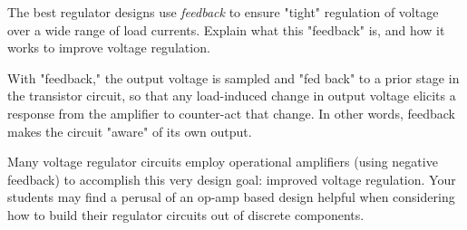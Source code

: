

The best regulator designs use {\it feedback} to ensure "tight" regulation of voltage over a wide range of load currents.  Explain what this "feedback" is, and how it works to improve voltage regulation.







With "feedback," the output voltage is sampled and "fed back" to a prior stage in the transistor circuit, so that any load-induced change in output voltage elicits a response from the amplifier to counter-act that change.  In other words, feedback makes the circuit "aware" of its own output.







Many voltage regulator circuits employ operational amplifiers (using negative feedback) to accomplish this very design goal: improved voltage regulation.  Your students may find a perusal of an op-amp based design helpful when considering how to build their regulator circuits out of discrete components.



